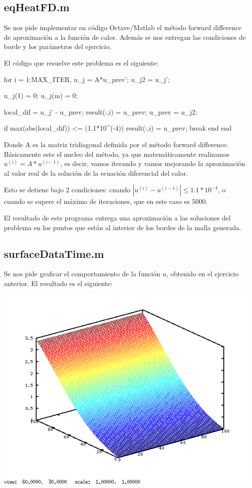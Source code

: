 \documentclass[12pt,letterpaper]{article}
\begin{document}
\subsection{eqHeatFD.m}
Se nos pide implementar en código Octave/Matlab el método forward difference de aproximación a la función de calor. Además se nos entregan las condiciones de borde y los parámetros del ejercicio.

El código que resuelve este problema es el siguiente:
\begin{verbatimtab}[4]
	for i = 1:MAX_ITER,
		u_j = A*u_prev';		
		u_j2 = u_j';
	
		u_j(1) = 0;
		u_j(m) = 0;
	
		local_dif = u_j' - u_prev;
		result(:,i) = u_prev;
		u_prev = u_j2;		
	
		if max(abs(local_dif)) <= (1.1*10^(-4))
			result(:,i) = u_prev;
			break
		end
	end
\end{verbatimtab}

Donde A es la matriz tridiagonal definida por el método forward difference. Básicamente este el nucleo del método, ya que matemáticamente realizamos $u^{(i)} = A*u^{(i-1)}$, es decir, vamos iterando y vamos mejorando la aproximación al valor real de la solución de la ecuación diferencial del calor.

Esto se detiene bajo 2 condiciones: cuando $|u^{(i)} - u^{(i-1)}| \leq 1.1 * 10^{-4}$, o cuando se supere el máximo de iteraciones, que en este caso es $5000$.

El resultado de este programa entrega una aproximación a las soluciones del problema en los puntos que están al interior de los bordes de la malla generada.

\subsection{surfaceDataTime.m}
Se nos pide graficar el comportamiento de la función $u$, obtenido en el ejercicio anterior. El resultado es el siguiente:

\includegraphics[width=\textwidth]{./pregunta2.png}
\\
\end{document}
